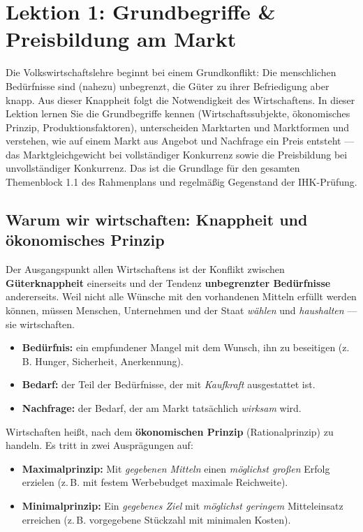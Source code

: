\documentclass[11pt, a4paper]{article}
\begin{document}
\section{Lektion 1: Grundbegriffe \& Preisbildung am Markt}
\begin{merksatz}[title={\bfseries Worum geht es in dieser Lektion?}]
Die Volkswirtschaftslehre beginnt bei einem Grundkonflikt: Die menschlichen Bedürfnisse
sind (nahezu) unbegrenzt, die Güter zu ihrer Befriedigung aber knapp. Aus dieser Knappheit
folgt die Notwendigkeit des Wirtschaftens. In dieser Lektion lernen Sie die Grundbegriffe
kennen (Wirtschaftssubjekte, ökonomisches Prinzip, Produktionsfaktoren), unterscheiden
Marktarten und Marktformen und verstehen, wie auf einem Markt aus Angebot und Nachfrage
ein Preis entsteht --- das Marktgleichgewicht bei vollständiger Konkurrenz sowie die
Preisbildung bei unvollständiger Konkurrenz. Das ist die Grundlage für den gesamten
Themenblock 1.1 des Rahmenplans und regelmäßig Gegenstand der IHK-Prüfung.
\end{merksatz}



\subsection{Warum wir wirtschaften: Knappheit und ökonomisches Prinzip}

Der Ausgangspunkt allen Wirtschaftens ist der Konflikt zwischen \textbf{Güterknappheit}
einerseits und der Tendenz \textbf{unbegrenzter Bedürfnisse} andererseits. Weil nicht alle
Wünsche mit den vorhandenen Mitteln erfüllt werden können, müssen Menschen, Unternehmen
und der Staat \emph{wählen} und \emph{haushalten} --- sie wirtschaften.

\begin{itemize}
  \item \textbf{Bedürfnis:} ein empfundener Mangel mit dem Wunsch, ihn zu beseitigen
    (z.\,B. Hunger, Sicherheit, Anerkennung).
  \item \textbf{Bedarf:} der Teil der Bedürfnisse, der mit \emph{Kaufkraft} ausgestattet ist.
  \item \textbf{Nachfrage:} der Bedarf, der am Markt tatsächlich \emph{wirksam} wird.
\end{itemize}

Wirtschaften heißt, nach dem \textbf{ökonomischen Prinzip} (Rationalprinzip) zu handeln.
Es tritt in zwei Ausprägungen auf:

\begin{itemize}
  \item \textbf{Maximalprinzip:} Mit \emph{gegebenen Mitteln} einen \emph{möglichst großen}
    Erfolg erzielen (z.\,B. mit festem Werbebudget maximale Reichweite).
  \item \textbf{Minimalprinzip:} Ein \emph{gegebenes Ziel} mit \emph{möglichst geringem}
    Mitteleinsatz erreichen (z.\,B. vorgegebene Stückzahl mit minimalen Kosten).
\end{itemize}
\end{document}
